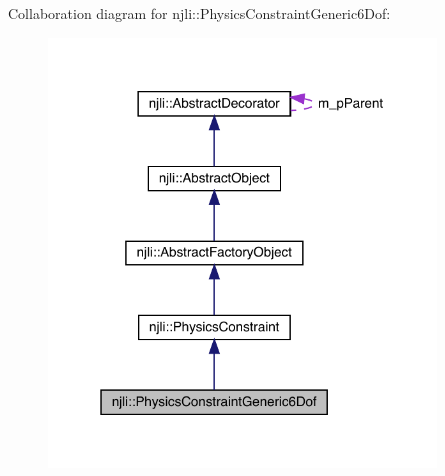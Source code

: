 Collaboration diagram for njli\+:\+:Physics\+Constraint\+Generic6\+Dof\+:\nopagebreak
\begin{figure}[H]
\begin{center}
\leavevmode
\includegraphics[width=292pt]{classnjli_1_1_physics_constraint_generic6_dof__coll__graph}
\end{center}
\end{figure}
